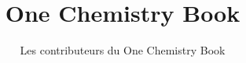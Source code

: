 \documentclass[11pt,a4paper,twoside,openany]{book}
\title{One Chemistry Book}
\author{Les contributeurs du One Chemistry Book}
\date{\bookdate}
\begin{document}
\frontmatter




\tableofcontents

\mainmatter



\appendix
\part{\omsolutionspart}


\backmatter
\printindex
\end{document}
